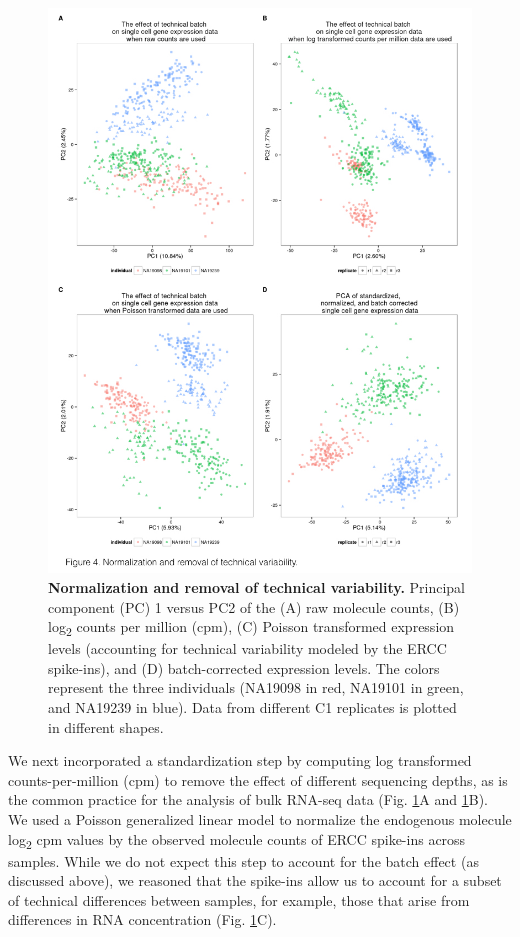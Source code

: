 \begin{figure}[htbp]
\centering
\includegraphics[trim=0 .5in 0 0,clip,width=5in]{img/ch04/Figure04.jpeg}
\caption[Normalization and removal of technical
variability.]{\textbf{Normalization and removal of technical
variability.} Principal component (PC) 1 versus PC2 of the (A) raw
molecule counts, (B) log\textsubscript{2} counts per million (cpm), (C)
Poisson transformed expression levels (accounting for technical
variability modeled by the ERCC spike-ins), and (D) batch-corrected
expression levels. The colors represent the three individuals (NA19098
in red, NA19101 in green, and NA19239 in blue). Data from different C1
replicates is plotted in different shapes.}
\label{fig:normalization}
\end{figure}

We next incorporated a standardization step by computing log transformed
counts-per-million (cpm) to remove the effect of different sequencing
depths, as is the common practice for the analysis of bulk RNA-seq data
(Fig. \ref{fig:normalization}A and \ref{fig:normalization}B). We used a Poisson generalized linear model to
normalize the endogenous molecule log\textsubscript{2} cpm values by the
observed molecule counts of ERCC spike-ins across samples. While we do
not expect this step to account for the batch effect (as discussed
above), we reasoned that the spike-ins allow us to account for a subset
of technical differences between samples, for example, those that arise
from differences in RNA concentration (Fig. \ref{fig:normalization}C).

